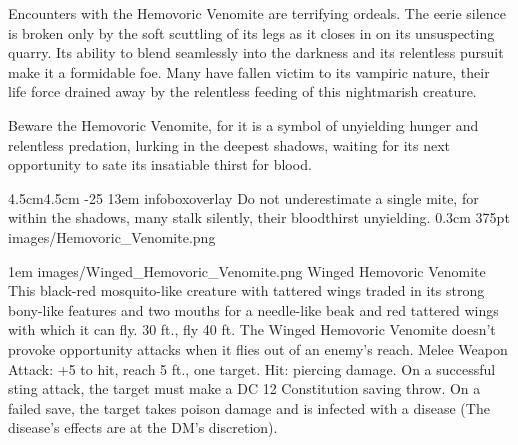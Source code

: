 \documentclass[letterpaper,openany,twoside,twocolumn]{book}
\begin{document}
Encounters with the Hemovoric Venomite are terrifying ordeals. The eerie silence is broken only by the soft scuttling of its legs as it closes in on its unsuspecting quarry. Its ability to blend seamlessly into the darkness and its relentless pursuit make it a formidable foe. Many have fallen victim to its vampiric nature, their life force drained away by the relentless feeding of this nightmarish creature.

Beware the Hemovoric Venomite, for it is a symbol of unyielding hunger and relentless predation, lurking in the deepest shadows, waiting for its next opportunity to sate its insatiable thirst for blood.

\MonsterGraphicAndShortInfo%
	{4.5cm}{4.5cm}%
	{-25}%
	{13em}%
	{infoboxoverlay} %
	{Do not underestimate a single mite, for within the shadows, many stalk silently, their bloodthirst unyielding.}%
	{0.3cm}%
	{375pt}%
	{images/Hemovoric_Venomite.png}%

\vfill\eject %

\MonsterVariant%
	{1em}%
	{images/Winged_Hemovoric_Venomite.png}%
	{Winged Hemovoric Venomite}%
	{%
		This black-red mosquito-like creature with tattered wings traded in its strong bony-like features and two mouths for a needle-like beak and red tattered wings with which it can fly.
		30 ft., fly 40 ft.
		The Winged Hemovoric Venomite doesn't provoke opportunity attacks when it flies out of an enemy's reach.
		Melee Weapon Attack: +5 to hit, reach 5 ft., one target. Hit:  piercing damage. On a successful sting attack, the target must make a DC 12 Constitution saving throw. On a failed save, the target takes  poison damage and is infected with a disease (The disease's effects are at the DM's discretion).
	}%
\end{document}
